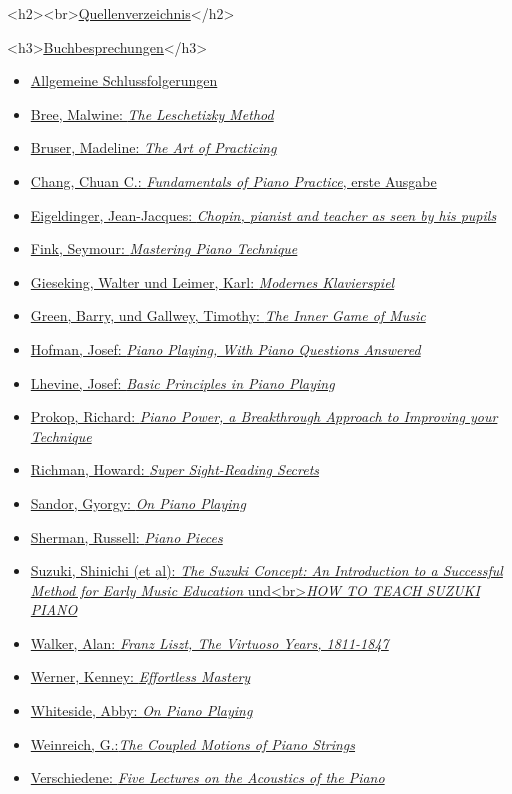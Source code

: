 <h2><br>\hyperref[reference]{Quellenverzeichnis}</h2>

<h3>\underline{\hyperref[reference]{Buchbesprechungen}}</h3>
\begin{itemize} 
 \item \hyperref[allgemein]{Allgemeine Schlussfolgerungen}
 \item \hyperref[Bree]{Bree, Malwine: \textit{The Leschetizky Method}}
 \item \hyperref[Bruser]{Bruser, Madeline: \textit{The Art of Practicing}}
 \item \hyperref[Chang]{Chang, Chuan C.: \textit{Fundamentals of Piano Practice}, erste Ausgabe}
 \item \hyperref[Eigeldinger]{Eigeldinger, Jean-Jacques: \textit{Chopin, pianist and teacher as seen by his pupils}}
 \item \hyperref[Fink]{Fink, Seymour: \textit{Mastering Piano Technique}}
 \item \hyperref[Gieseking]{Gieseking, Walter und Leimer, Karl: \textit{Modernes Klavierspiel}}
 \item \hyperref[Green]{Green, Barry, und Gallwey, Timothy: \textit{The Inner Game of Music}}
 \item \hyperref[Hofman]{Hofman, Josef: \textit{Piano Playing, With Piano Questions Answered}}
 \item \hyperref[Lhevine]{Lhevine, Josef: \textit{Basic Principles in Piano Playing}}
 \item \hyperref[Prokop]{Prokop, Richard: \textit{Piano Power, a Breakthrough Approach to Improving your Technique}}
 \item \hyperref[Richman]{Richman, Howard: \textit{Super Sight-Reading Secrets}}
 \item \hyperref[Sandor]{Sandor, Gyorgy: \textit{On Piano Playing}}
 \item \hyperref[Sherman]{Sherman, Russell: \textit{Piano Pieces}}
 \item \hyperref[Suzuki]{Suzuki, Shinichi (et al): \textit{The Suzuki Concept: An Introduction to a Successful Method for Early Music Education} und<br>\textit{HOW TO TEACH SUZUKI PIANO}}
 \item \hyperref[Walker]{Walker, Alan: \textit{Franz Liszt, The Virtuoso Years, 1811-1847}}
 \item \hyperref[Werner]{Werner, Kenney: \textit{Effortless Mastery}}
 \item \hyperref[Whiteside]{Whiteside, Abby: \textit{On Piano Playing}}
 \item \hyperref[American]{Weinreich, G.:\textit{The Coupled Motions of Piano Strings}}
 \item \hyperref[Lectures]{Verschiedene: \textit{Five Lectures on the Acoustics of the Piano}}
 \end{itemize}


